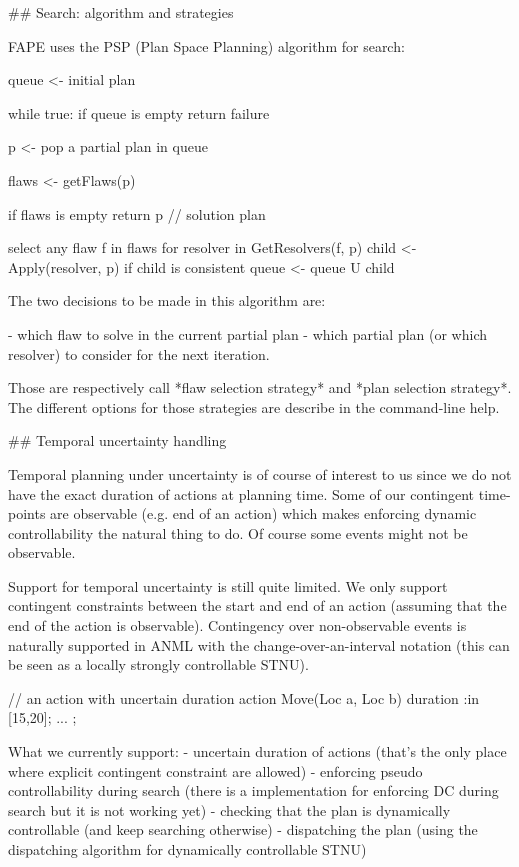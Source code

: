 ## Search: algorithm and strategies

FAPE uses the PSP (Plan Space Planning) algorithm for search:

    queue <- { initial plan }

    while true:
      if queue is empty
        return failure

      p <- pop a partial plan in queue

      flaws <- getFlaws(p)
      
      if flaws is empty
        return p // solution plan

      select any flaw f in flaws
      for resolver in GetResolvers(f, p)
        child <- Apply(resolver, p)
        if child is consistent
          queue <- queue U { child }

    
The two decisions to be made in this algorithm are:

 - which flaw to solve in the current partial plan
 - which partial plan (or which resolver) to consider for the next iteration.

Those are respectively call *flaw selection strategy* and *plan selection strategy*.
The different options for those strategies are describe in the command-line help.

## Temporal uncertainty handling

Temporal planning under uncertainty is of course of interest to us since we do 
not have the exact duration of actions at planning time.
Some of our contingent time-points are observable (e.g. end of an action) which makes 
enforcing dynamic controllability the natural thing to do.
Of course some events might not be observable.

Support for temporal uncertainty is still quite limited. We only support 
contingent constraints between the start and end of an action (assuming that 
the end of the action is observable).
Contingency over non-observable events is naturally supported in ANML with the 
change-over-an-interval notation (this can be seen as a locally strongly 
controllable STNU).

    // an action with uncertain duration
    action Move(Loc a, Loc b) {
      duration :in [15,20];
      ...
    };

What we currently support:
 - uncertain duration of actions (that's the only place where explicit 
contingent constraint are allowed)
 - enforcing pseudo controllability during search (there is a implementation 
for enforcing DC during search but it is not working yet)
 - checking that the plan is dynamically controllable (and keep searching 
otherwise)
 - dispatching the plan (using the dispatching algorithm for dynamically 
controllable STNU)


